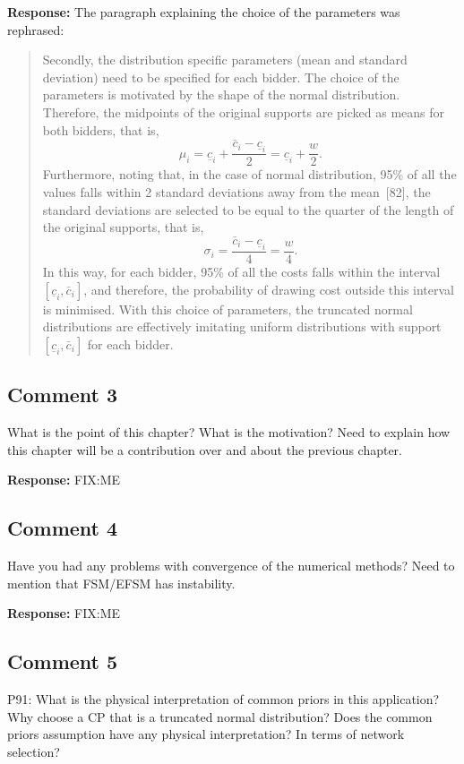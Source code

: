 \documentclass[10pt,a4paper,notitlepage]{article}
\numberwithin{equation}{section}
\begin{document}
\textbf{Response:}
The paragraph explaining the choice of the parameters was rephrased:
\begin{quote}
Secondly, the distribution specific parameters (mean and standard deviation) need to be specified for each bidder. The choice of the parameters is motivated by the shape of the normal distribution. Therefore, the midpoints of the original supports are picked as means for both bidders, that is,
\begin{equation}
\mu_i = \underline{c}_i + \frac{\bar{c}_i - \underline{c}_i}{2} = \underline{c}_i + \frac{w}{2}.
\end{equation}
Furthermore, noting that, in the case of normal distribution, 95\% of all the values falls within 2 standard deviations away from the mean~[82], the standard deviations are selected to be equal to the quarter of the length of the original supports, that is,
\begin{equation}
\sigma_i = \frac{\bar{c}_i - \underline{c}_i}{4} = \frac{w}{4}.
\end{equation}
In this way, for each bidder, 95\% of all the costs falls within the interval $[\underline{c}_i, \bar{c}_i]$, and therefore, the probability of drawing cost outside this interval is minimised. With this choice of parameters, the truncated normal distributions are effectively imitating uniform distributions with support $[\underline{c}_i, \bar{c}_i]$ for each bidder.
\end{quote}

\subsection{Comment 3}
What is the point of this chapter? What is the motivation? Need to explain how this chapter will be a contribution over and about the previous chapter.

\textbf{Response:}
FIX:ME

\subsection{Comment 4}
Have you had any problems with convergence of the numerical methods? Need to mention that FSM/EFSM has instability.

\textbf{Response:}
FIX:ME

\subsection{Comment 5}
P91: What is the physical interpretation of common priors in this application? Why choose a CP that is a truncated normal distribution? Does the common priors assumption have any physical interpretation? In terms of network selection?
\end{document}
